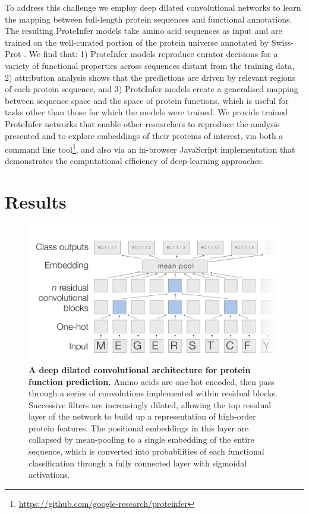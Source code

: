 To address this challenge we employ deep dilated convolutional networks to learn the mapping between full-length protein sequences and functional annotations. The resulting ProteInfer models take amino acid sequences as input and are trained on the well-curated portion of the protein universe annotated by Swiss-Prot \cite{uniprotlatest}. We find that: 1) ProteInfer models reproduce curator decisions for a  variety of functional properties across sequences distant from the training data, 2) attribution analysis shows that the predictions are driven by relevant regions of each protein sequence, and 3) ProteInfer models create a generalised mapping between sequence space and the space of protein functions, which is useful for tasks other than those for which the models were trained. We provide trained ProteInfer networks that enable other researchers to reproduce the analysis presented and to explore embeddings of their proteins of interest, via both a command line tool\footnote{\url{https://github.com/google-research/proteinfer}}, and also via an in-browser JavaScript implementation that demonstrates the computational efficiency of deep-learning approaches.
\section*{Results}
\DIFaddbegin 

\DIFaddend \begin{figure}[h!]
\centering
  \DIFdelbeginFL %
\DIFdelendFL \DIFaddbeginFL \includegraphics[width=\columnwidth]{figure.pdf}\DIFaddendFL %
  \caption{\textbf{A deep dilated convolutional architecture for protein function prediction.} Amino acids are one-hot encoded, then pass through a series of convolutions implemented within residual blocks. Successive filters are increasingly dilated, allowing the top residual layer of the network to build up a representation of high-order protein features. The positional embeddings in this layer are collapsed by mean-pooling to a single embedding of the entire sequence, which is converted into probabilities of each functional classification through a fully connected layer with sigmoidal activations. }
  \label{architecture}
\end{figure}
